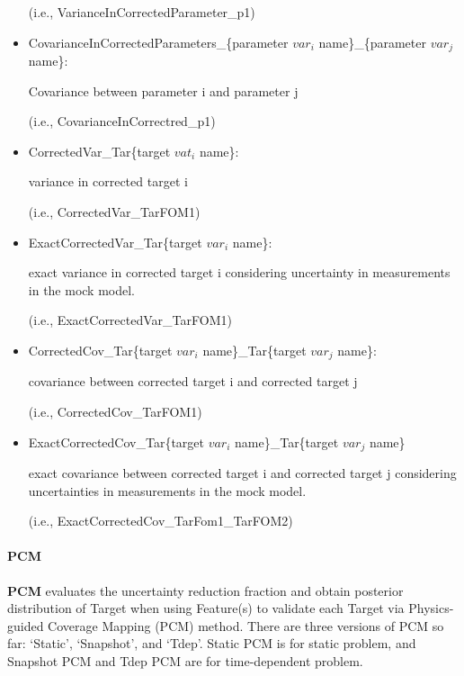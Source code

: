 \begin{itemize}
  (i.e., VarianceInCorrectedParameter\_p1)

  \item CovarianceInCorrectedParameters\_\{parameter $var_i$ name\}\_\{parameter $var_j$ name\}:

 Covariance between parameter i and parameter j

 (i.e., CovarianceInCorrectred\_p1)

  \item CorrectedVar\_Tar\{target $vat_i$ name\}:

   variance in corrected target i

   (i.e., CorrectedVar\_TarFOM1)

  \item ExactCorrectedVar\_Tar\{target $var_i$ name\}:

  exact variance in corrected target i considering uncertainty in measurements in the mock model.

  (i.e., ExactCorrectedVar\_TarFOM1)

  \item CorrectedCov\_Tar\{target $var_i$ name\}\_Tar\{target $var_j$ name\}:

  covariance between corrected target i and corrected target j

  (i.e., CorrectedCov\_TarFOM1)

  \item ExactCorrectedCov\_Tar\{target $var_i$ name\}\_Tar\{target $var_j$ name\}

   exact covariance between corrected target i and corrected target j considering uncertainties in measurements in the mock model.

   (i.e., ExactCorrectedCov\_TarFom1\_TarFOM2)


\end{itemize}


\paragraph{PCM}
\textbf{PCM} evaluates the uncertainty reduction fraction and obtain posterior distribution of Target
when using Feature(s) to validate each Target via Physics-guided Coverage Mapping (PCM) method. There are
three versions of PCM so far: `Static', `Snapshot', and `Tdep'. Static PCM is for static problem, and Snapshot PCM
and Tdep PCM are for time-dependent problem.

